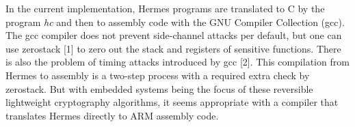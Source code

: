 In the current implementation, Hermes programs are translated to C by the program \emph{hc} and then to assembly code with the GNU Compiler Collection (gcc). The gcc compiler does not prevent side-channel attacks per default, but one can use zerostack [1] to zero out the stack and registers of sensitive functions.
There is also the problem of timing attacks introduced by gcc [2].
This compilation from Hermes to assembly is a two-step process with a required extra check by zerostack. But with embedded systems being the focus of these reversible lightweight cryptography algorithms, it seems appropriate with a compiler that translates Hermes directly to ARM assembly code.


%
%
%
%
